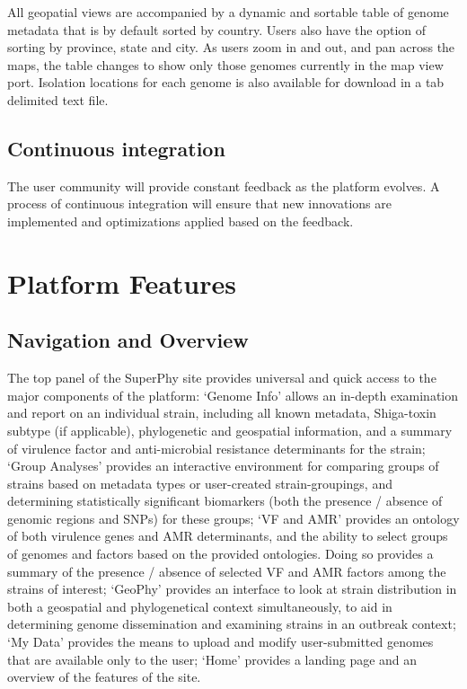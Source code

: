 \documentclass[doublespacing, linenumbers]{bmcart}
\begin{document}
All geopatial views are accompanied by a dynamic and sortable table of genome metadata that is by default sorted by country. Users also have the option of sorting by province, state and city. As users zoom in and out, and pan across the maps, the table changes to show only those genomes currently in the map view port. Isolation locations for each genome is also available for download in a tab delimited text file.

\subsection{Continuous integration}
The user community will provide constant feedback as the platform evolves. A process of continuous integration will ensure that new innovations are implemented and optimizations applied based on the feedback.

\section{Platform Features}
\subsection{Navigation and Overview}
The top panel of the SuperPhy site provides universal and quick access to the major components of the platform: `Genome Info'  allows an in-depth examination and report on an individual strain, including all known metadata, Shiga-toxin subtype (if applicable), phylogenetic and geospatial information, and a summary of virulence factor and anti-microbial resistance determinants for the strain; `Group Analyses' provides an interactive environment for comparing groups of strains based on metadata types or user-created strain-groupings, and determining statistically significant biomarkers (both the presence / absence of genomic regions and SNPs) for these groups; `VF and AMR' provides an ontology of both virulence genes and AMR determinants, and the ability to select groups of genomes and factors based on the provided ontologies. Doing so provides a summary of the presence / absence of selected VF and AMR factors among the strains of interest; `GeoPhy' provides an interface to look at strain distribution in both a geospatial and phylogenetical context simultaneously, to aid in determining genome dissemination and examining strains in an outbreak context; `My Data' provides the means to upload and modify user-submitted genomes that are available only to the user; `Home' provides a landing page and an overview of the features of the site. 
\end{document}
